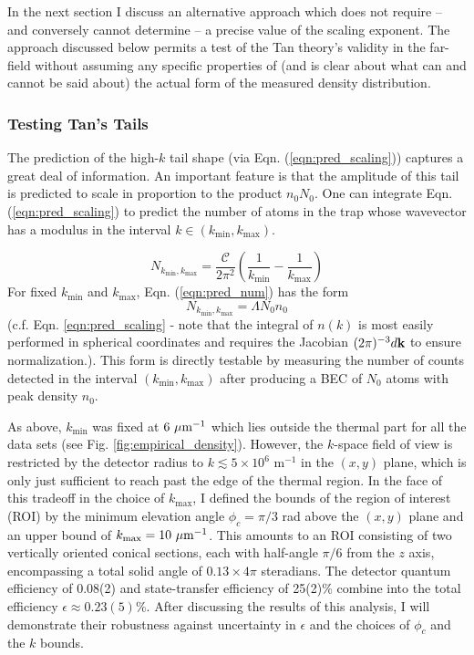 	In the next section I discuss an alternative approach which does not require -- and conversely cannot determine -- a precise value of the scaling exponent. 
	The approach discussed below permits a test of the Tan theory's validity in the far-field without assuming any specific properties of (and is clear about what can and cannot be said about) the actual form of the measured density distribution.
	
\subsubsection{Testing Tan's Tails}
\label{sec:regression}


	The prediction of the high-$k$ tail shape (via Eqn. (\ref{eqn:pred_scaling})) captures a great deal of information. 
	An important feature is that the amplitude of this tail is predicted to scale in proportion to the product $n_0 N_0$.
	One can integrate Eqn. (\ref{eqn:pred_scaling}) to predict the number of atoms in the trap whose wavevector has a modulus in the interval $k\in (k_\textrm{min}, k_\textrm{max})$. 

	\begin{equation}
		N_{k_\textrm{min},k_\textrm{max}} =\frac{\mathcal{C}}{2\pi^2}\left(\frac{1}{k_\textrm{min}}-\frac{1}{k_\textrm{max}}\right)
		\label{eqn:pred_num}
	\end{equation}
	For fixed $k_\textrm{min}$ and $k_\textrm{max}$, Eqn. (\ref{eqn:pred_num}) has the form {
	\begin{equation}
	N_{k_\textrm{min},k_\textrm{max}} = \Lambda N_0n_0
			\label{eqn:Lambda}
	\end{equation}
	}%
	(c.f. Eqn. \ref{eqn:pred_scaling} - note that the integral of $n(k)$ is most easily performed in spherical coordinates and requires the Jacobian $(2\pi)^{-3}d \textbf{k}$ to ensure normalization.). 
	This form is directly testable by measuring the number of counts detected in the interval $(k_\textrm{min},k_\textrm{max})$ after producing a BEC of $N_0$ atoms with peak density $n_0$. 
	
	As above, $k_\textrm{min}$ was fixed at $6~\mu\textrm{m}^{-1}$ which lies outside the thermal part for all the data sets (see Fig. \ref{fig:empirical_density}).
	However, the $k$-space field of view is restricted by the detector radius to $k\lesssim5\times 10^6$ m$^{-1}$ in the $(x,y)$ plane, which is only just sufficient to reach past the edge of the thermal region. 
	In the face of this tradeoff in the choice of $k_\textrm{max}$, I defined the bounds of the region of interest (ROI) by the minimum elevation angle $\phi_c=\pi/3$ rad above the $(x,y)$ plane and an upper bound of $k_\textrm{max} = 10~\mu\textrm{m}^{-1}$.
	This amounts to an ROI consisting of two vertically oriented conical sections, each with half-angle $\pi/6$ from the $z$ axis, encompassing a total solid angle of $0.13\times 4\pi$ steradians. 
	The detector quantum efficiency of 0.08(2) and state-transfer efficiency of 25(2)\% combine  into the total efficiency $\epsilon\approx0.23(5)\%$.
	After discussing the results of this analysis, I will demonstrate their robustness against uncertainty in $\epsilon$ and the choices of $\phi_c$ and the $k$ bounds.

